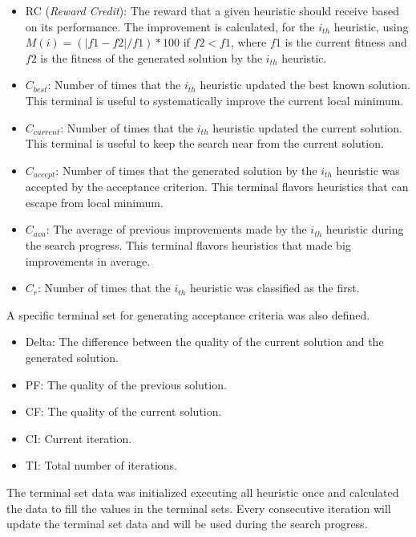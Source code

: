 \documentclass[conference]{IEEEtran}
\begin{document}
\begin{itemize}
	\item RC (\textit{Reward Credit}): The reward that a given heuristic should receive based on its performance. The improvement is calculated, for the $i_{th}$ heuristic, using $M(i) = (|f1 -f2|/f1)*100$ if $f2< f1$, where $f1$ is the current fitness and $f2$ is the fitness of the generated solution by the $i_{th}$ heuristic.
	
 	\item $C_{best}$: Number of times that the $i_{th}$ heuristic updated the best known solution. This terminal is useful to systematically improve the current local minimum.  

	\item $C_{current}$: Number of times that the $i_{th}$ heuristic updated the current solution. This terminal is useful to keep the search near from the current solution.

	\item $C_{accept}$: Number of times that the generated solution 
	by the $i_{th}$ heuristic was accepted by the acceptance criterion. This terminal flavors heuristics that can escape from local minimum.

	\item $C_{ava}$: The average of previous improvements made by the $i_{th}$ heuristic during the search progress. This terminal flavors heuristics that made big improvements in average.
	\item $C_r$: Number of times that the $i_{th}$ heuristic was classified as the first.
	
	\end{itemize} 

A specific terminal set for generating acceptance criteria was also defined.

 \begin{itemize}
 	 \item Delta: The difference between the quality of the current solution and the generated solution.
 	\item PF: The quality of the previous solution.
 	\item CF: The quality of the current solution.
 	\item CI: Current iteration.
 	\item TI: Total number of iterations.
 \end{itemize}
 
 The terminal set data was initialized executing all heuristic once and calculated the data to fill the values in the terminal sets. Every consecutive iteration will update the terminal set data and will be used during the search progress.
 
\end{document}
